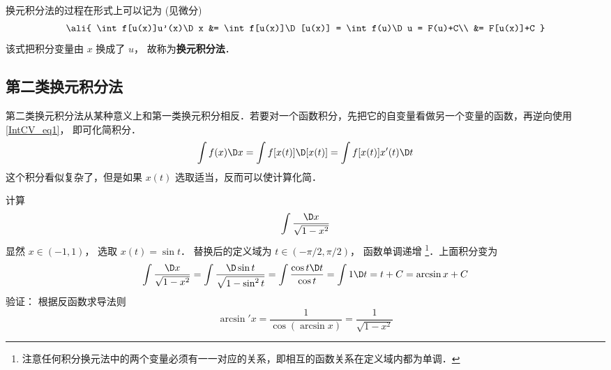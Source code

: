 换元积分法的过程在形式上可以记为 (见微分)
\begin{equation}\label{IntCV_eq1}
\ali{
\int f[u(x)]u'(x)\D x &= \int f[u(x)]\D [u(x)] = \int f(u)\D u = F(u)+C\\
&= F[u(x)]+C
}\end{equation}
该式把积分变量由 $x$ 换成了 $u$， 故称为\textbf{换元积分法}．

\subsection{第二类换元积分法}
第二类换元积分法从某种意义上和第一类换元积分相反．若要对一个函数积分，先把它的自变量看做另一个变量的函数，再逆向使用\autoref{IntCV_eq1}， 即可化简积分．
\begin{equation}\label{IntCV_eq6}
\int f(x)\D x = \int f[x(t)]\D [x(t)] = \int f[x(t)]x'(t)\D t
\end{equation}
这个积分看似复杂了，但是如果 $x(t)$ 选取适当，反而可以使计算化简．

\begin{exam}{}
计算
\begin{equation}
\int \frac{\D x}{\sqrt{1-x^2}}
\end{equation}
显然 $x \in ( - 1,1)$， 选取 $x(t)=\sin t$． 替换后的定义域为 $t \in ( -\pi/2,\pi/2)$， 函数单调递增 \footnote{注意任何积分换元法中的两个变量必须有一一对应的关系，即相互的函数关系在定义域内都为单调．}．上面积分变为
\begin{equation}
\int \frac{\D x}{\sqrt{1-x^2}}  = \int \frac{\D\sin t}{\sqrt{1-\sin^2 t}} = \int \frac{\cos t\D t}{\cos t}  = \int {1\D t}  = t + C = \arcsin x + C
\end{equation}
验证： 根据反函数求导法则
\begin{equation}
\arcsin'x = \frac{1}{\cos(\arcsin x)} = \frac{1}{{\sqrt {1 - {x^2}} }}
\end{equation}
\end{exam}




